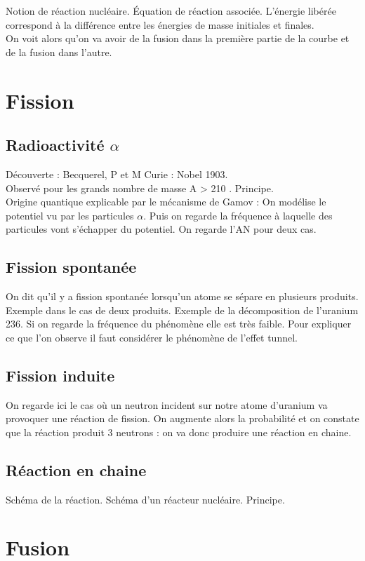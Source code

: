 \documentclass[12pt,prb,aps,epsf]{article}
\begin{document}
Notion de réaction nucléaire. Équation de réaction associée. L'énergie libérée correspond à la différence entre les énergies de masse initiales et finales.\\

On voit alors qu'on va avoir de la fusion dans la première partie de la courbe et de la fusion dans l'autre.

\section{Fission}
\subsection{Radioactivité $\alpha$}
Découverte	: Becquerel, P et M Curie : Nobel 1903.\\
Observé pour les grands nombre de masse A > 210 .
Principe.\\
Origine quantique explicable par le mécanisme de Gamov : On modélise le potentiel vu par les particules $\alpha$. Puis on regarde la fréquence à laquelle des particules vont s'échapper du potentiel. On regarde l'AN pour deux cas.

\subsection{Fission spontanée}
 On dit qu'il y a fission spontanée lorsqu'un atome se sépare en plusieurs produits. Exemple dans le cas de deux produits. Exemple de la décomposition de l'uranium 236. Si on regarde la fréquence du phénomène elle est très faible. Pour expliquer ce que l'on observe il faut considérer le phénomène de l'effet tunnel.
 
 \subsection{Fission induite}
 On regarde ici le cas où un neutron incident sur notre atome d'uranium va provoquer une réaction de fission. On augmente alors la probabilité et on constate que la réaction produit 3 neutrons : on va donc produire une réaction en chaine.
 
 \subsection{Réaction en chaine}
 Schéma de la réaction. Schéma d'un réacteur nucléaire. Principe.
 
 \section{Fusion}
\end{document}
